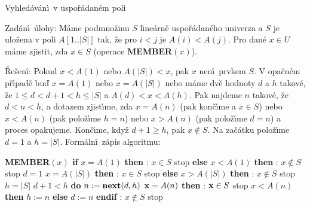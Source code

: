 \documentclass[a4paper,12pt]{article}
\begin{document}
\heading
Vyhled\'av\'an\'\i\ v uspo\v r\'adan\'em poli
\endheading

\flushpar Zad\'an\'\i\ \'ulohy: M\'ame podmno\v zinu $S$ line\'arn\v e 
uspo\v r\'adan\'eho univerza a $S$ je ulo\v zena v poli 
$A[1..|S|]$ tak, \v ze pro $i<j$ je $A(i)<A(j)$. Pro dan\'e $x\in 
U$ 
m\'ame zjistit, zda $x\in S$ (operace {\bf MEMBER$(x)$}).
\medskip

\flushpar\v Re\v sen\'\i :  Pokud $x<A(1)$ nebo $A(|S|)<x$, pak $
x$ 
nen\'\i\ prvkem $S$.  V opa\v cn\'em p\v r\'\i pad\v e bu\v d $x=
A(1)$ nebo 
$x=A(|S|)$ nebo m\'ame dv\v e hodnoty $d$ 
a $h$ takov\'e, \v ze $1\le d<d+1<h\le |S|$ a $A(d)<x<A(h)$.  Pak 
najdeme $n$ takov\'e, \v ze $d<n<h$, a dotazem 
zjist\'\i me, zda $x=A(n)$ (pak kon\v c\'\i me a $x\in S$) nebo 
$x<A(n)$ (pak polo\v z\'\i me $h=n$) nebo $x>A(n)$ (pak 
polo\v z\'\i me $d=n$) a proces opakujeme.  Kon\v c\'\i me, kdy\v z 
$d+1\ge h$, pak $x\notin S$. Na za\v c\'atku polo\v z\'\i me $d=1$ a $
h=|S|$.
Form\'aln\'\i\ z\'apis algoritmu:
\bigskip

{\bf MEMBER$(x)$\newline 
if} $x=A(1)$ {\bf then}\newline 
\phantom{---}{\bf V\'ystup}: $x\in S$ stop\newline 
{\bf else}\newline 
\phantom{---}{\bf if} $x<A(1)$ {\bf then}\newline 
\phantom{------}{\bf V\'ystup}: $x\notin S$ stop\newline 
\phantom{---}{\bf else}\newline 
\phantom{------}$d=1$\newline 
\phantom{---}{\bf endif\newline
\bf endif\newline 
if} $x=A(|S|)$ {\bf then}\newline 
\phantom{---}{\bf V\'ystup}: $x\in S$ stop\newline 
{\bf else}\newline 
\phantom{---}{\bf if} $x>A(|S|)$ {\bf then}\newline 
\phantom{------}{\bf V\'ystup}: $x\notin S$ stop\newline 
\phantom{---}{\bf else}\newline 
\phantom{------}$h=|S|$\newline 
\phantom{---}{\bf endif\newline
endif\newline 
while} $d+1<h$ {\bf do}\newline 
\phantom{---}$n:=\text{{\bf next}}(d,h)$\newline 
\phantom{---}{\bf if} $\bold x=A(n)$ {\bf then}\newline 
\phantom{------}{\bf V\'ystup}: $\bold x\in S$ stop\newline 
\phantom{---}{\bf else}\newline 
\phantom{------}{\bf if} $x<A(n)$ {\bf then} $h:=n$ {\bf else} $d:=n$ {\bf endif}\newline 
\phantom{---}{\bf endif\newline 
enddo\newline 
V\'ystup}: $x\notin S$ stop
\medskip
\end{document}
